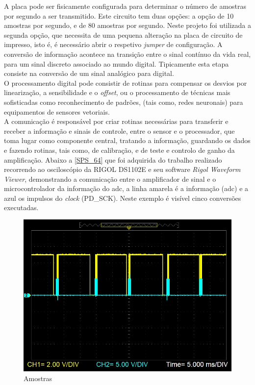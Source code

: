 A placa 
pode ser fisicamente configurada para determinar o número de amostras por segundo a ser transmitido. Este circuito tem duas opções: a opção de 10 amostras por segundo, e de 80 amostras por segundo. Neste projeto foi utilizada a segunda opção, que necessita de uma pequena alteração na placa de circuito de impresso, isto é, é necessário abrir o respetivo \textit{jumper} de configuração.
\emptyline
A conversão de informação acontece na transição entre o sinal contínuo da vida real, para um sinal discreto associado ao mundo digital. Tipicamente esta etapa consiste na conversão de um sinal analógico para digital.\cite{book-9}\\
O processamento digital pode consistir de rotinas para compensar os desvios por linearização, a sensibilidade e o \textit{offset}, ou o processamento de técnicas mais sofisticadas como reconhecimento de padrões, (tais como, redes neuronais) para equipamentos de sensores vetoriais.\cite{book-9}\\
A comunicação é responsável por criar rotinas necessárias para transferir e receber a informação e sinais de controle, entre o sensor e o processador, que toma lugar como componente central, tratando a informação, guardando os dados e fazendo rotinas, tais como, de calibração, e de teste e controlo de ganho da amplificação. \cite{book-9}
\emptyline
Abaixo a \autoref{SPS_64} que foi adquirida do trabalho realizado recorrendo ao osciloscópio da RIGOL DS1102E e seu software \textit{Rigol Waveform Viewer}, demonstrando a comunicação entre o amplificador de sinal e o microcontrolador da informação do \acs{adc}, a linha amarela é a informação (\acs{adc}) e a azul os impulsos do \textit{clock} (PD\_SCK). Neste exemplo é visível cinco conversões executadas.\\
\begin{figure}[H]
	\centering
	\includegraphics[scale=0.42]{./image/PESTA/graph/80SPS64GAIN/SPS_80.JPG}
	\caption{Amostras}
	\label{SPS_64}
\end{figure}
